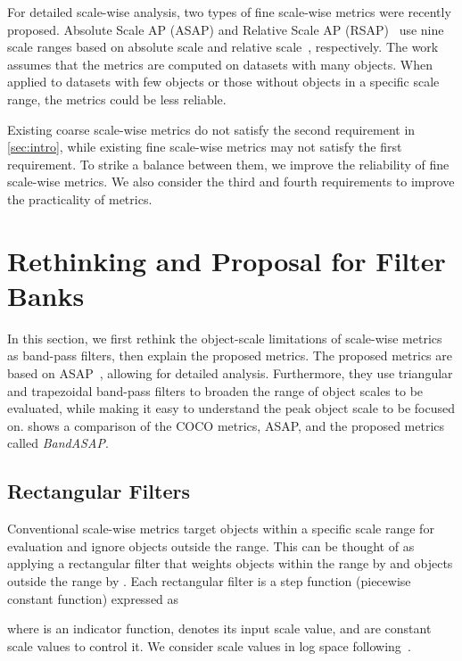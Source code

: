 \documentclass{mva_style}
\begin{document}
For detailed scale-wise analysis, two types of fine scale-wise metrics were recently proposed.
Absolute Scale AP (ASAP) and Relative Scale AP (RSAP)~\cite{USB_Shinya_BMVC2022} use nine scale ranges based on absolute scale and relative scale~\cite{TinyPerson_WACV2020}, respectively.
The work assumes that the metrics are computed on datasets with many objects.
When applied to datasets with few objects or those without objects in a specific scale range, the metrics could be less reliable.

Existing coarse scale-wise metrics do not satisfy the second requirement in \cref{sec:intro},
while existing fine scale-wise metrics may not satisfy the first requirement.
To strike a balance between them, we improve the reliability of fine scale-wise metrics.
We also consider the third and fourth requirements to improve the practicality of metrics.







\section{Rethinking and Proposal for Filter Banks}
\label{sec:proposed_metrics}

In this section, we first rethink the object-scale limitations of scale-wise metrics as band-pass filters, then explain the proposed metrics.
The proposed metrics are based on ASAP~\cite{USB_Shinya_BMVC2022}, allowing for detailed analysis.
Furthermore, they use triangular and trapezoidal band-pass filters to broaden the range of object scales to be evaluated, while making it easy to understand the peak object scale to be focused on.
 shows a comparison of the COCO metrics, ASAP, and the proposed metrics called \textit{BandASAP}.


\subsection{Rectangular Filters}

Conventional scale-wise metrics target objects within a specific scale range for evaluation and ignore objects outside the range.
This can be thought of as applying a rectangular filter that weights objects within the range by  and objects outside the range by .
Each rectangular filter is a step function (piecewise constant function) expressed as

where  is an indicator function,
 denotes its input scale value,
and  are constant scale values to control it.
We consider scale values in log space following~\cite{Caltech_PAMI2012}.
\end{document}
